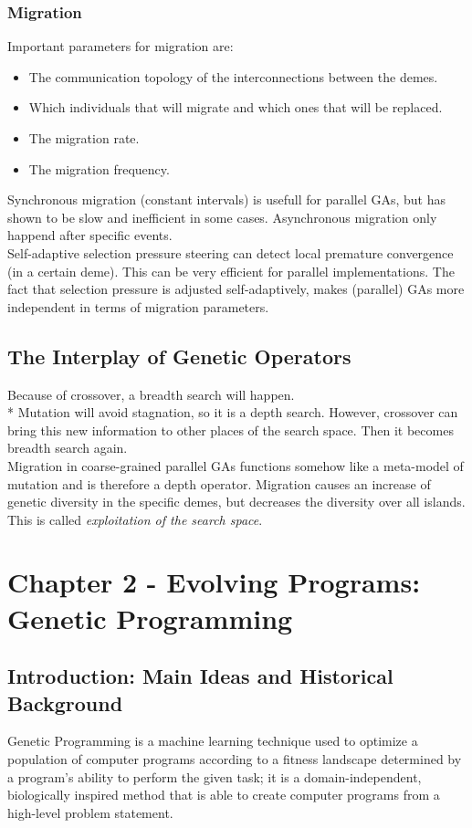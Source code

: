 \documentclass[12pt]{article}
\begin{document}
\subsubsection{Migration}
Important parameters for migration are:
\begin{itemize}
\item The communication topology of the interconnections between the demes.
\item Which individuals that will migrate and which ones that will be replaced.
\item The migration rate.
\item The migration frequency.
\end{itemize}
Synchronous migration (constant intervals) is usefull for parallel GAs, but has shown to be slow and inefficient in some cases. Asynchronous migration only happend after specific events.\\
Self-adaptive selection pressure steering can detect local premature convergence (in a certain deme). This can be very efficient for parallel implementations. The fact that selection pressure is adjusted self-adaptively, makes (parallel) GAs more independent in terms of migration parameters.
\subsection{The Interplay of Genetic Operators}
Because of crossover, a breadth search will happen.\\*
Mutation will avoid stagnation, so it is a depth search. However, crossover can bring this new information to other places of the search space. Then it becomes breadth search again.\\
Migration in coarse-grained parallel GAs functions somehow like a meta-model of mutation and is therefore a depth operator. Migration causes an increase of genetic diversity in the specific demes, but decreases the diversity over all islands. This is called \textit{exploitation of the search space}.
\clearpage
\section{Chapter 2 - Evolving Programs: Genetic Programming}
\subsection{Introduction: Main Ideas and Historical Background}
Genetic Programming is a machine learning technique used to optimize a population of computer programs according to a fitness landscape determined by a program's ability to perform the given task; it is a domain-independent, biologically inspired method that is able to create computer programs from a high-level problem statement.
\end{document}
